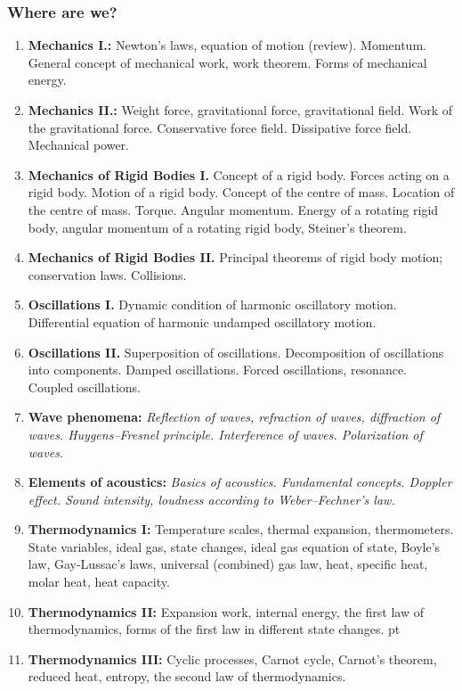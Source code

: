 \documentclass[t,aspectratio=169]{beamer}
\begin{document}
\begin{frame}
\frametitle{Where are we?}
\begin{enumerate}
\setlength{\parskip}{0pt}
\setlength{\itemsep}{0pt}
\item \textbf{Mechanics I.:} Newton’s laws, equation of motion (review). Momentum. General concept of mechanical work, work theorem. Forms of mechanical energy.
\item \textbf{Mechanics II.:} Weight force, gravitational force, gravitational field. Work of the gravitational force. Conservative force field. Dissipative force field. Mechanical power.
\item \textbf{Mechanics of Rigid Bodies I.} Concept of a rigid body. Forces acting on a rigid body. Motion of a rigid body. Concept of the centre of mass. Location of the centre of mass. Torque. Angular momentum. Energy of a rotating rigid body, angular momentum of a rotating rigid body, Steiner’s theorem.
\item \textbf{Mechanics of Rigid Bodies II.} Principal theorems of rigid body motion; conservation laws. Collisions.
\item \textbf{Oscillations I.} Dynamic condition of harmonic oscillatory motion. Differential equation of harmonic undamped oscillatory motion.
\pagebreak
\item \textbf{Oscillations II.} Superposition of oscillations. Decomposition of oscillations into components. Damped oscillations. Forced oscillations, resonance. Coupled oscillations.
\item \textbf{Wave phenomena:} \textit{Reflection of waves, refraction of waves, diffraction of waves. Huygens–Fresnel principle. Interference of waves. Polarization of waves.}
\item \textbf{Elements of acoustics:} \textit{Basics of acoustics. Fundamental concepts. Doppler effect. Sound intensity, loudness according to Weber–Fechner’s law.}
\item \textbf{Thermodynamics I:} Temperature scales, thermal expansion, thermometers. State variables, ideal gas, state changes, ideal gas equation of state, Boyle’s law, Gay-Lussac’s laws, universal (combined) gas law, heat, specific heat, molar heat, heat capacity.
\item \textbf{Thermodynamics II:} Expansion work, internal energy, the first law of thermodynamics, forms of the first law in different state changes.
\pagebreak
{} pt
\item \textbf{Thermodynamics III:} Cyclic processes, Carnot cycle, Carnot’s theorem, reduced heat, entropy, the second law of thermodynamics.

\end{enumerate}
\end{frame}
\end{document}
